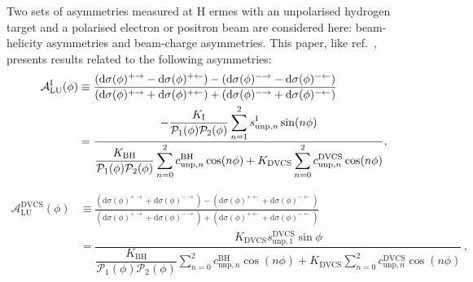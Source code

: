 \documentclass[11pt,a4paper]{article}
\begin{document}
Two sets of asymmetries measured at H{\sc
ermes} with an unpolarised hydrogen target and a polarised electron or positron
beam are considered here:
beam-helicity asymmetries and beam-charge asymmetries. This paper,
like ref.~\cite{Air09}, presents results related to the following asymmetries:
\begin{align}
\hspace{0.5cm}\mathcal{A}^{\textrm{I}}_{\textrm{LU}}(\phi) &\equiv
\frac{(\textrm{d}\sigma(\phi)^{+\rightarrow} -
\textrm{d}\sigma(\phi)^{+\leftarrow}) -
(\textrm{d}\sigma(\phi)^{-\rightarrow}
- \textrm{d}\sigma(\phi)^{-\leftarrow})}{(\textrm{d}\sigma(\phi)^{+\rightarrow}
+
\textrm{d}\sigma(\phi)^{+\leftarrow}) +
(\textrm{d}\sigma(\phi)^{-\rightarrow}
+ \textrm{d}\sigma(\phi)^{-\leftarrow})}&  \nonumber \\
&=\dfrac{-\dfrac{K_{\textrm{I}}}{\mathcal{P}_{1}(\phi)\mathcal{P}_{2}(\phi)}
\displaystyle\sum_{n=1}^2
s_{\textrm{unp},n}^{\textrm{I}}\sin(n\phi)}{\dfrac{K_{\textrm{BH}}}{\mathcal{P}_{1}
(\phi)\mathcal{P}_{
2}(\phi)}
\displaystyle\sum_{n=0}^2
c_{\textrm{unp},n}^{\textrm{BH}}\cos(n\phi) + 
K_{\textrm{DVCS}}\displaystyle\sum_{n=0}^2 c_{\textrm{unp},n}^{\textrm{DVCS}}\cos(n\phi)},& 
\label{e:alui}
\end{align}

\begin{align}
\mathcal{A}^{\textrm{DVCS}}_{\textrm{LU}}(\phi) &\equiv
\frac{(\textrm{d}\sigma(\phi)^{+\rightarrow} +
\textrm{d}\sigma(\phi)^{-\rightarrow}) -
(\textrm{d}\sigma(\phi)^{+\leftarrow} + 
\textrm{d}\sigma(\phi)^{-\leftarrow})}
{(\textrm{d}\sigma(\phi)^{+\rightarrow} +
\textrm{d}\sigma(\phi)^{-\rightarrow}) +
(\textrm{d}\sigma(\phi)^{+\leftarrow}
+ \textrm{d}\sigma(\phi)^{-\leftarrow})}& \nonumber \\[0.4cm]
&=\dfrac{ K_{\textrm{DVCS}} s_{\textrm{unp},1}^{\textrm{DVCS}}\sin\phi}{\dfrac{K_{\textrm{BH}}}{\mathcal{P}_{1}
(\phi)\mathcal{P}_{2}(\phi)}
\displaystyle\sum_{n=0}^2
c_{\textrm{unp},n}^{\textrm{BH}}\cos(n\phi) + 
K_{\textrm{DVCS}}\displaystyle\sum_{n=0}^2
c_{\textrm{unp},n}^{\textrm{DVCS}}\cos(n\phi)}\, , &
\label{e:aludvcs}
\end{align}
\end{document}
